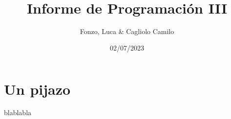 \documentclass[10 pt, A4paper]{article}
\title{Informe de Programación III}
\author{Fonzo, Luca \& Cagliolo Camilo}
\date{02/07/2023}
\begin{document}
	\maketitle
	\section{Un pijazo}
	blablabla
\end{document}
